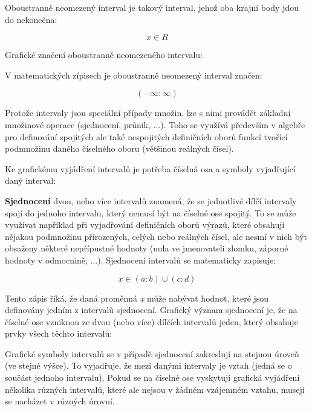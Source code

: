 Oboustranně neomezený interval je takový interval, jehož oba krajní body jdou do nekonečna:

$$ x \in R $$

Grafické značení oboustranně neomezeného intervalu:

\vskip 4mm
\centerline{}
\vskip 4mm

V matematických zípisech je oboustranně neomezený interval značen:

$$ \left( -\infty:\infty \right) $$


Protože intervaly jsou speciální případy množin, lze s nimi provádět základní množinové operace (sjednocení, průnik, ...). Toho se využívá především v algebře pro definování spojitých ale také nespojitých definičních oborů funkcí tvořící podmnožinu daného číselného oboru (většinou reálných čísel).

Ke grafickému vyjádření intervalů je potřeba číselná osa a symboly vyjadřující daný interval:

\vskip 4mm
\centerline{}
\vskip 4mm


{\bf Sjednocení} dvou, nebo více intervalů znamená, že se jednotlivé dílčí intervaly spojí do jednoho intervalu, který nemusí být na číselné ose spojitý. To se může využívat například při vyjadřování definičních oborů výrazů, které obsahují nějakou podmnožinu přirozených, celých nebo reálných čísel, ale nesmí v nich být obsaženy některé nepřípustné hodnoty (nula ve jmenovateli zlomku, záporné hodnoty v odmocnině, ...).  Sjednocení intervalů se matematicky zapisuje:

$$ x \in (a:b) \cup (c:d) $$

Tento zápis říká, že daná proměnná {\it x} může nabývat hodnot, které jsou definovány jedním z intervalů sjednocení. Grafický význam sjednocení je, že na číselné ose vzniknou ze dvou (nebo více) dílčích intervalů jeden, který obsahuje prvky všech těchto intervalů:

\vskip 4mm
\centerline{}
\vskip 4mm

Grafické symboly intervalů se v případě sjednocení zakreslují na stejnou úroveň (ve stejné výšce). To vyjadřuje, že mezi danými intervaly je vztah (jedná se o součást jednoho intervalu). Pokud se na číselné ose vyskytují grafická vyjádření několika různých intervalů, které ale nejsou v žádném vzájemném vztahu, musejí se nacházet v různých úrovní.

